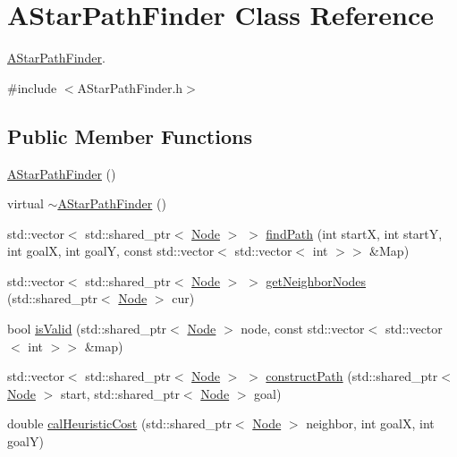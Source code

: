 \hypertarget{classAStarPathFinder}{}\section{A\+Star\+Path\+Finder Class Reference}
\label{classAStarPathFinder}


\hyperlink{classAStarPathFinder}{A\+Star\+Path\+Finder}.  




{\ttfamily \#include $<$A\+Star\+Path\+Finder.\+h$>$}

\subsection*{Public Member Functions}
\begin{DoxyCompactItemize}
\item 
\hyperlink{classAStarPathFinder_adfae926e32955b2c3e43909ad7961a9a}{A\+Star\+Path\+Finder} ()
\item 
virtual \hyperlink{classAStarPathFinder_a3b92e1a0571086969027599fc2a488e5}{$\sim$\+A\+Star\+Path\+Finder} ()
\item 
std\+::vector$<$ std\+::shared\+\_\+ptr$<$ \hyperlink{classNode}{Node} $>$ $>$ \hyperlink{classAStarPathFinder_a7f2f09b49b4dbfed90cf4f2e4f5783d8}{find\+Path} (int startX, int startY, int goalX, int goalY, const std\+::vector$<$ std\+::vector$<$ int $>$$>$ \&Map)
\item 
std\+::vector$<$ std\+::shared\+\_\+ptr$<$ \hyperlink{classNode}{Node} $>$ $>$ \hyperlink{classAStarPathFinder_a153563a6eb940562512a4e2aca0e958d}{get\+Neighbor\+Nodes} (std\+::shared\+\_\+ptr$<$ \hyperlink{classNode}{Node} $>$ cur)
\item 
bool \hyperlink{classAStarPathFinder_a43bdab730bb812a70c0da813f1302859}{is\+Valid} (std\+::shared\+\_\+ptr$<$ \hyperlink{classNode}{Node} $>$ node, const std\+::vector$<$ std\+::vector$<$ int $>$$>$ \&map)
\item 
std\+::vector$<$ std\+::shared\+\_\+ptr$<$ \hyperlink{classNode}{Node} $>$ $>$ \hyperlink{classAStarPathFinder_adc4361b6085d2436a03388c7e0489d22}{construct\+Path} (std\+::shared\+\_\+ptr$<$ \hyperlink{classNode}{Node} $>$ start, std\+::shared\+\_\+ptr$<$ \hyperlink{classNode}{Node} $>$ goal)
\item 
double \hyperlink{classAStarPathFinder_a5510513176fae8044e6f4be5ed7faa43}{cal\+Heuristic\+Cost} (std\+::shared\+\_\+ptr$<$ \hyperlink{classNode}{Node} $>$ neighbor, int goalX, int goalY)
\end{DoxyCompactItemize}



